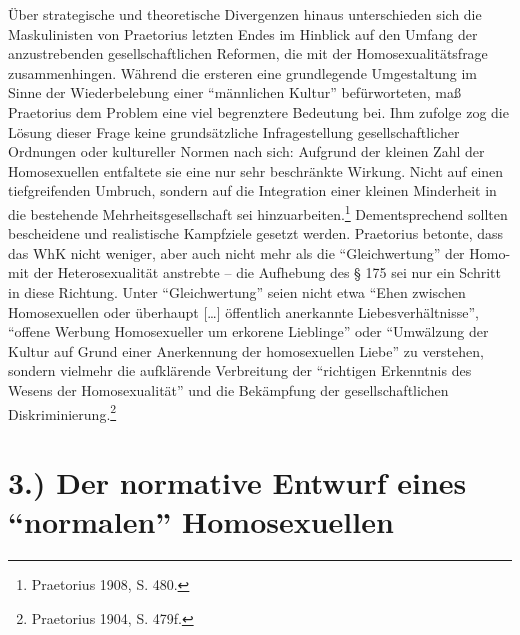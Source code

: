 \documentclass[a4paper,
fontsize=11pt,
oneside,
numbers=noperiodatend,
parskip=half-,
bibliography=totoc,
final
]{scrartcl}
\begin{document}
Über strategische und theoretische Divergenzen hinaus unterschieden sich
die Maskulinisten von Praetorius letzten Endes im Hinblick auf den
Umfang der anzustrebenden gesellschaftlichen Reformen, die mit der
Homosexualitätsfrage zusammenhingen. Während die ersteren eine
grundlegende Umgestaltung im Sinne der Wiederbelebung einer
\enquote{männlichen Kultur} befürworteten, maß Praetorius dem Problem
eine viel begrenztere Bedeutung bei. Ihm zufolge zog die Lösung dieser
Frage keine grundsätzliche Infragestellung gesellschaftlicher Ordnungen
oder kultureller Normen nach sich: Aufgrund der kleinen Zahl der
Homosexuellen entfaltete sie eine nur sehr beschränkte Wirkung. Nicht
auf einen tiefgreifenden Umbruch, sondern auf die Integration einer
kleinen Minderheit in die bestehende Mehrheitsgesellschaft sei
hinzuarbeiten.\footnote{Praetorius 1908, S. 480.} Dementsprechend
sollten bescheidene und realistische Kampfziele gesetzt werden.
Praetorius betonte, dass das WhK nicht weniger, aber auch nicht mehr als
die \enquote{Gleichwertung} der Homo- mit der Heterosexualität anstrebte
-- die Aufhebung des § 175 sei nur ein Schritt in diese Richtung. Unter
\enquote{Gleichwertung} seien nicht etwa \enquote{Ehen zwischen
Homosexuellen oder überhaupt {[}\ldots{}{]} öffentlich anerkannte
Liebesverhältnisse}, \enquote{offene Werbung Homosexueller um erkorene
Lieblinge} oder \enquote{Umwälzung der Kultur auf Grund einer
Anerkennung der homosexuellen Liebe} zu verstehen, sondern vielmehr die
aufklärende Verbreitung der \enquote{richtigen Erkenntnis des Wesens der
Homosexualität} und die Bekämpfung der gesellschaftlichen
Diskriminierung.\footnote{Praetorius 1904, S. 479f.}

\section*{\texorpdfstring{3.) Der normative Entwurf eines
\enquote{normalen}
Homosexuellen}{3.) Der normative Entwurf eines normalen Homosexuellen}}\label{der-normative-entwurf-eines-normalen-homosexuellen}
\end{document}
